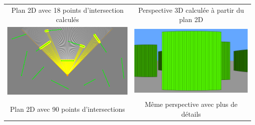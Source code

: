 \documentclass[11pt,french,a4paper,]{article}
\begin{document}
\begin{longtable}[]{@{}cc@{}}
\begin{minipage}[t]{0.47\columnwidth}\centering
Plan 2D avec 18 points d'intersection calculés\strut
\end{minipage} & \begin{minipage}[t]{0.47\columnwidth}\centering
Perspective 3D calculée à partir du plan 2D\strut
\end{minipage}\tabularnewline
\begin{minipage}[t]{0.47\columnwidth}\centering
\includegraphics{../img/IntersectionComparison/rays_intersections_more.png}\strut
\end{minipage} & \begin{minipage}[t]{0.47\columnwidth}\centering
\includegraphics{../img/IntersectionComparison/3d_simple_raycast_more.png}\strut
\end{minipage}\tabularnewline
\begin{minipage}[t]{0.47\columnwidth}\centering
Plan 2D avec 90 points d'intersections\strut
\end{minipage} & \begin{minipage}[t]{0.47\columnwidth}\centering
Même perspective avec plus de détails\strut
\end{minipage}\tabularnewline
\bottomrule
\end{longtable}
\end{document}
